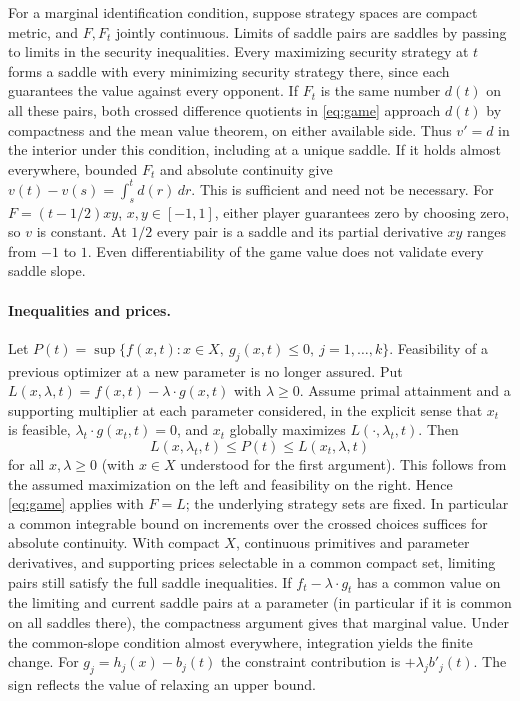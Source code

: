 \documentclass[11pt]{article}
\begin{document}
For a marginal identification condition, suppose strategy spaces are compact metric, and $F,F_t$ jointly continuous. Limits of saddle pairs are saddles by passing to limits in the security inequalities. Every maximizing security strategy at $t$ forms a saddle with every minimizing security strategy there, since each guarantees the value against every opponent. If $F_t$ is the same number $d(t)$ on all these pairs, both crossed difference quotients in \eqref{eq:game} approach $d(t)$ by compactness and the mean value theorem, on either available side. Thus $v'=d$ in the interior under this condition, including at a unique saddle. If it holds almost everywhere, bounded $F_t$ and absolute continuity give $v(t)-v(s)=\int_s^t d(r)\,dr$. This is sufficient and need not be necessary. For $F=(t-1/2)xy$, $x,y\in[-1,1]$, either player guarantees zero by choosing zero, so $v$ is constant. At $1/2$ every pair is a saddle and its partial derivative $xy$ ranges from $-1$ to $1$. Even differentiability of the game value does not validate every saddle slope.

\paragraph{Inequalities and prices.}
Let $P(t)=\sup\{f(x,t):x\in X,\ g_j(x,t)\le0,\ j=1,\ldots,k\}$. Feasibility of a previous optimizer at a new parameter is no longer assured. Put $L(x,\lambda,t)=f(x,t)-\lambda\cdot g(x,t)$ with $\lambda\ge0$. Assume primal attainment and a supporting multiplier at each parameter considered, in the explicit sense that $x_t$ is feasible, $\lambda_t\cdot g(x_t,t)=0$, and $x_t$ globally maximizes $L(\cdot,\lambda_t,t)$. Then
\[
 L(x,\lambda_t,t)\le P(t)\le L(x_t,\lambda,t)
\]
for all $x,\lambda\ge0$ (with $x\in X$ understood for the first argument). This follows from the assumed maximization on the left and feasibility on the right. Hence \eqref{eq:game} applies with $F=L$; the underlying strategy sets are fixed. In particular a common integrable bound on increments over the crossed choices suffices for absolute continuity. With compact $X$, continuous primitives and parameter derivatives, and supporting prices selectable in a common compact set, limiting pairs still satisfy the full saddle inequalities. If $f_t-\lambda\cdot g_t$ has a common value on the limiting and current saddle pairs at a parameter (in particular if it is common on all saddles there), the compactness argument gives that marginal value. Under the common-slope condition almost everywhere, integration yields the finite change. For $g_j=h_j(x)-b_j(t)$ the constraint contribution is $+\lambda_j b'_j(t)$. The sign reflects the value of relaxing an upper bound.
\end{document}
